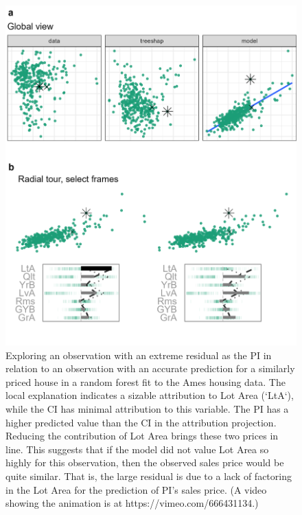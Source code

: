 \documentclass[
]{jss}
\begin{document}
\begin{CodeChunk}
\begin{figure}

{\centering \includegraphics[width=0.9\linewidth]{./figures/case_ames2018} 

}

\caption[Exploring an observation with an extreme residual as the PI in relation to an observation with an accurate prediction for a similarly priced house in a random forest fit to the Ames housing data]{Exploring an observation with an extreme residual as the PI in relation to an observation with an accurate prediction for a similarly priced house in a random forest fit to the Ames housing data. The local explanation indicates a sizable attribution to Lot Area (`LtA`), while the CI has minimal attribution to this variable. The PI has a higher predicted value than the CI in the attribution projection. Reducing the contribution of Lot Area brings these two prices in line. This suggests that if the model did not value Lot Area so highly for this observation, then the observed sales price would be quite similar. That is, the large residual is due to a lack of factoring in the Lot Area for the prediction of PI's sales price. (A video showing the animation is at https://vimeo.com/666431134.)}\label{fig:caseames}
\end{figure}
\end{CodeChunk}
\end{document}
